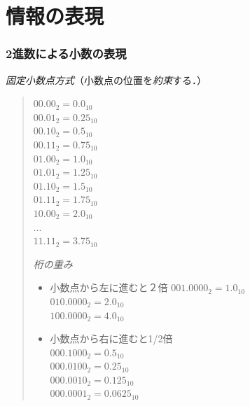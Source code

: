 \documentclass[handout]{beamer}        %
\begin{document}
\section{情報の表現}
\begin{frame}
  \frametitle{2進数による小数の表現}
  \emph{固定小数点方式}（小数点の位置を\emph{約束}する．）
  \vfill
  \begin{quote}
    \begin{minipage}{0.4\columnwidth}
      $00.00_2 = 0.0_{10}$  \\
      $00.01_2 = 0.25_{10}$  \\
      $00.10_2 = 0.5_{10}$  \\
      $00.11_2 = 0.75_{10}$  \\
      $01.00_2 = 1.0_{10}$  \\
      $01.01_2 = 1.25_{10}$  \\
      $01.10_2 = 1.5_{10}$  \\
      $01.11_2 = 1.75_{10}$  \\
      $10.00_2 = 2.0_{10}$  \\
      ...\\
      $11.11_2 = 3.75_{10}$
    \end{minipage}
    \begin{minipage}{0.5\columnwidth}
      \emph{桁の重み}
      \begin{itemize}
      \item 小数点から左に進むと２倍
        $001.0000_2 = 1.0_{10}$ \\
        $010.0000_2 = 2.0_{10}$ \\
        $100.0000_2 = 4.0_{10}$ \\
        \vspace{1ex}
      \item 小数点から右に進むと1/2倍\\
        $000.1000_2 = 0.5_{10}$ \\
        $000.0100_2 = 0.25_{10}$ \\
        $000.0010_2 = 0.125_{10}$ \\
        $000.0001_2 = 0.0625_{10}$
      \end{itemize}
    \end{minipage}
  \end{quote}
\end{frame}
\end{document}
